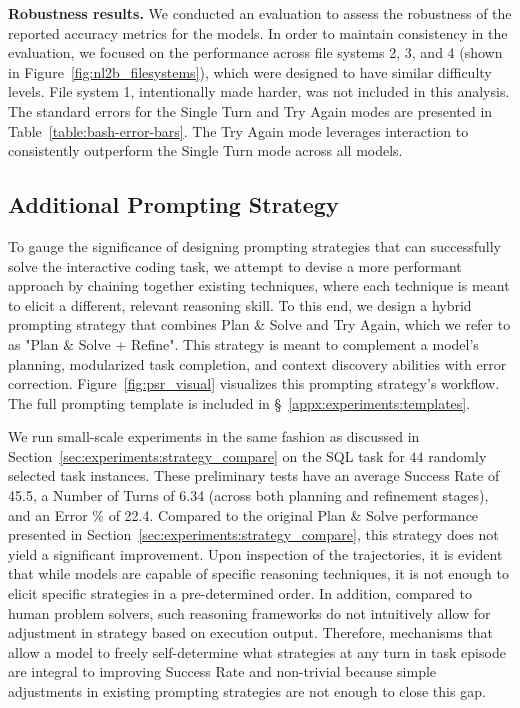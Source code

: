 \textbf{Robustness results.}
We conducted an evaluation to assess the robustness of the reported accuracy metrics for the models. In order to maintain consistency in the evaluation, we focused on the performance across file systems 2, 3, and 4 (shown in Figure~\ref{fig:nl2b_filesystems}), which were designed to have similar difficulty levels. File system 1, intentionally made harder, was not included in this analysis.
The standard errors for the Single Turn and Try Again modes are presented in Table~\ref{table:bash-error-bars}. The Try Again mode leverages interaction to consistently outperform the Single Turn mode across all models.



\subsection{Additional Prompting Strategy}
\label{appx:experiments:additional_strategies}

To gauge the significance of designing prompting strategies that can successfully solve the interactive coding task, we attempt to devise a more performant approach by chaining together existing techniques, where each technique is meant to elicit a different, relevant reasoning skill. To this end, we design a hybrid prompting strategy that combines Plan \& Solve and Try Again, which we refer to as "Plan \& Solve + Refine". This strategy is meant to complement a model's planning, modularized task completion, and context discovery abilities with error correction. Figure~\ref{fig:psr_visual} visualizes this prompting strategy's workflow. The full prompting template is included in \S~\ref{appx:experiments:templates}.



We run small-scale experiments in the same fashion as discussed in Section~\ref{sec:experiments:strategy_compare} on the SQL task for $44$ randomly selected task instances. These preliminary tests have an average Success Rate of 45.5, a Number of Turns of 6.34 (across both planning and refinement stages), and an Error \% of 22.4. Compared to the original Plan \& Solve performance presented in Section~\ref{sec:experiments:strategy_compare}, this strategy does not yield a significant improvement. Upon inspection of the trajectories, it is evident that while models are capable of specific reasoning techniques, it is not enough to elicit specific strategies in a pre-determined order. In addition, compared to human problem solvers, such reasoning frameworks do not intuitively allow for adjustment in strategy based on execution output. Therefore, mechanisms that allow a model to freely self-determine what strategies at any turn in task episode are integral to improving Success Rate and non-trivial because simple adjustments in existing prompting strategies are not enough to close this gap. 

